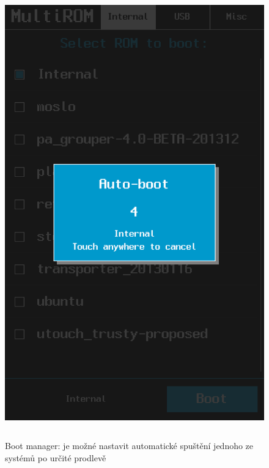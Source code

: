 \documentclass[12pt, a4paper, oneside]{article}
\begin{document}
\begin{figure}[H]
\begin{center}
 \includegraphics[height=550pt]{img/boot_manager_autoboot.png}
\caption{Boot manager: je možné nastavit automatické spuštění jednoho ze systémů po určité prodlevě}
\end{center}
\end{figure}
\end{document}
